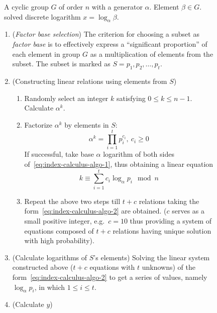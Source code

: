 \documentclass[12pt,journal,compsoc]{IEEEtran}
\begin{document}
\begin{figure}[!htbp]
  \centering
  \begin{algorithmic}
  \REQUIRE~A cyclic group $G$ of order $n$ with a generator
    $\alpha$. Element $\beta\in G$.
  \ENSURE~solved discrete logarithm $x=\log_{\alpha}\beta$.
  \begin{enumerate}
  \item (\emph{Factor base selection}) The criterion for choosing a
    subset as \emph{factor base} is to effectively express a
    ``significant proportion'' of each element in group $G$ as a
    multiplication of elements from the subset. The subset is marked
    as $S={p_{1},p_{2},\ldots,p_{t}}$.
  \item (Constructing linear relations using elements from $S$)
    \begin{enumerate}
    \item Randomly select an integer $k$ satisfying $0\leq k\leq
      n-1$. Calculate $\alpha^{k}$.
    \item Factorize $\alpha^{k}$ by elements in $S$:
      \begin{equation}
        \label{eq:index-calculus-algo-1}
        \alpha^{k}=\prod_{i=1}^{t}p_{i}^{c_{i}},~c_{i}\geq 0
      \end{equation}
      If successful, take base $\alpha$ logarithm of both sides
      of~\autoref{eq:index-calculus-algo-1}, thus obtaining a linear
      equation
      \begin{equation}
        \label{eq:index-calculus-algo-2}
        k\equiv \sum_{i=1}^{t}c_{i}\log_{\alpha}p_{i}\mod n
      \end{equation}
    \item Repeat the above two steps till $t+c$ relations taking the
      form~\ref{eq:index-calculus-algo-2} are obtained. ($c$ serves as
      a small positive integer, e.g.\ $c=10$ thus providing a system
      of equations composed of $t+c$  relations having unique solution
      with high probability).
    \end{enumerate}
  \item (Calculate logarithms of $S$'s elements) Solving the linear
    system constructed above ($t+c$ equations with $t$ unknowns) of
    the form~\autoref{eq:index-calculus-algo-2} to get a series of
    values, namely $\log_{\alpha}p_{i}$, in which $1\leq i\leq t$.
  \item (Calculate $y$)
\end{enumerate}
\end{algorithmic}
\end{figure}
\end{document}
